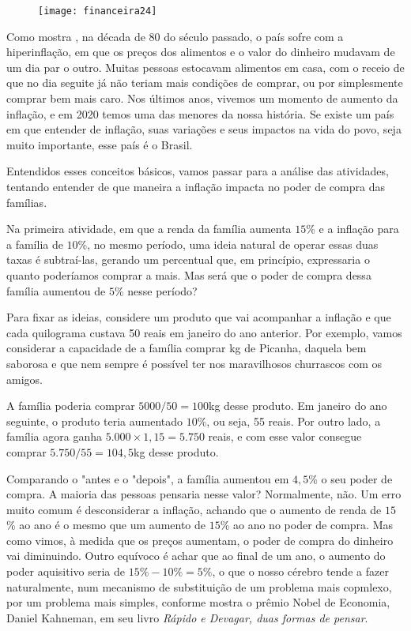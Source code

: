 \begin{observation}{}
\begin{figure}
\vspace{-1.5em}
\texttt{[image: financeira24]}

\end{figure}
Como mostra \cite{leitao2011}, na década de 80 do século passado, o país sofre com a hiperinflação, em que os preços dos alimentos e o valor do dinheiro mudavam de um dia par o outro. Muitas pessoas estocavam alimentos em casa, com o receio de que no dia seguite já não teriam mais condições de comprar, ou por simplesmente comprar bem mais caro. Nos últimos anos, vivemos um momento de aumento da inflação, e em 2020 temos uma das menores da nossa história. Se existe um país em que entender de inflação, suas variações e seus impactos na vida do povo, seja muito importante, esse país é o Brasil.
\end{observation}

Entendidos esses conceitos básicos, vamos passar para a análise das atividades, tentando entender de que maneira a inflação impacta no poder de compra das famílias.

Na primeira atividade, em que a renda da família aumenta $15$\% e a inflação para a família de $10$\%, no mesmo período, uma ideia natural de operar essas duas taxas é subtraí-las, gerando um percentual que, em princípio, expressaria o quanto poderíamos comprar a mais. Mas será que o poder de compra dessa família aumentou de $5$\% nesse período?

Para fixar as ideias, considere um produto que vai acompanhar a inflação e que cada quilograma custava 50 reais em janeiro do ano anterior. Por exemplo, vamos considerar a capacidade de a família comprar kg de Picanha, daquela bem saborosa e que nem sempre é possível ter nos maravilhosos churrascos com os amigos.

A família poderia comprar $5000/50=100$kg desse produto. Em janeiro do ano seguinte, o produto teria aumentado $10$\%, ou seja, 55 reais. Por outro lado, a família agora ganha $5.000\times1{,}15=5.750$ reais, e com esse valor consegue comprar $5.750/55=104{,}5$kg desse produto.

Comparando o "antes e o "depois", a família aumentou em $4{,}5$\% o seu poder de compra. A maioria das pessoas pensaria nesse valor? Normalmente, não.  Um erro muito comum é desconsiderar a inflação, achando que o aumento de renda de $15$\% ao ano é o mesmo que um aumento de $15$\% ao ano no poder de compra. Mas como vimos, à medida que os preços aumentam, o poder de compra do dinheiro vai diminuindo. Outro equívoco é achar que ao final de um ano, o aumento do poder aquisitivo seria de $15\%-10\%=5\%$, o que o nosso cérebro tende a fazer naturalmente, num mecanismo de substituição de um problema mais copmlexo, por um problema mais simples, conforme mostra o prêmio Nobel de Economia, Daniel Kahneman, em seu livro \textit{Rápido e Devagar, duas formas de pensar}.

